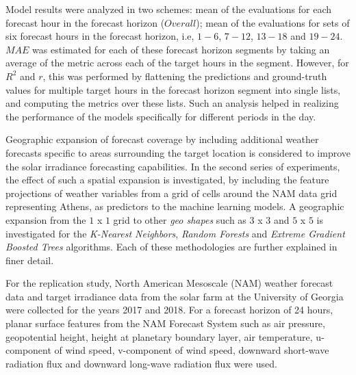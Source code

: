\par Model results were analyzed in two schemes: mean of the evaluations for each forecast hour in the forecast horizon ($Overall$); mean of the evaluations for sets of six forecast hours in the forecast horizon, i.e, $1 - 6$, $7 - 12$, $13 - 18$ and $19 - 24$. $MAE$ was estimated for each of these forecast horizon segments by taking an average of the metric across each of the target hours in the segment. However, for $R^2$ and $r$, this was performed by flattening the predictions and ground-truth values for multiple target hours in the forecast horizon segment into single lists, and computing the metrics over these lists. Such an analysis helped in realizing the performance of the models specifically for different periods in the day. 

\par Geographic expansion of forecast coverage by including additional weather forecasts specific to areas surrounding the target location is considered to improve the solar irradiance forecasting capabilities. In the second series of experiments, the effect of such a spatial expansion is investigated, by including the feature projections of weather variables from a grid of cells around the NAM data grid representing Athens, as predictors to the machine learning models. A geographic expansion from the $1$ x $1$ grid to other \textit{geo shapes} such as $3$ x $3$ and $5$ x $5$ is investigated for the \textit{K-Nearest Neighbors}, \textit{Random Forests} and \textit{Extreme Gradient Boosted Trees} algorithms. Each of these methodologies are further explained in finer detail.

\par For the replication study, North American Mesoscale (NAM) weather forecast data and target irradiance data from the solar farm at the University of Georgia were collected for the years 2017 and 2018. For a forecast horizon of 24 hours, planar surface features from the NAM Forecast System such as air pressure, geopotential height, height at planetary boundary layer, air temperature, u-component of wind speed, v-component of wind speed, downward short-wave radiation flux and downward long-wave radiation flux were used. 

